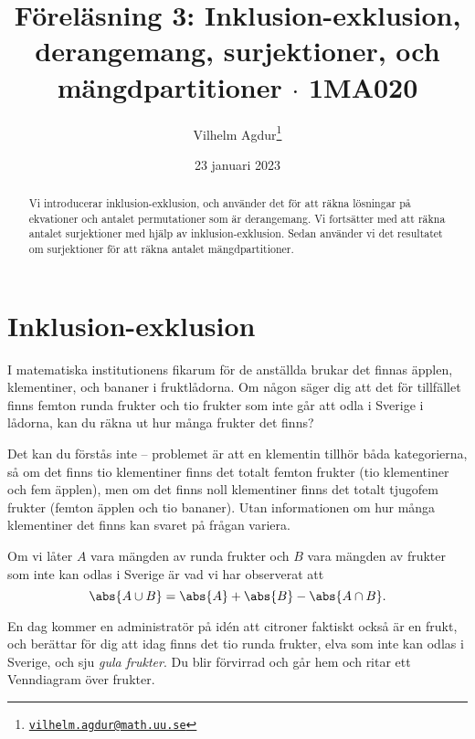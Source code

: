 \documentclass[nobib]{tufte-handout}
\title{Föreläsning 3: Inklusion-exklusion, derangemang, surjektioner, och mängdpartitioner $\cdot$ 1MA020}
\author[Vilhelm Agdur]{Vilhelm Agdur\thanks{\href{mailto:vilhelm.agdur@math.uu.se}{\nolinkurl{vilhelm.agdur@math.uu.se}}}}
\date{23 januari 2023}
\begin{document}
\maketitle%

\begin{abstract}
\noindent
Vi introducerar inklusion-exklusion, och använder det för att räkna lösningar på ekvationer och antalet permutationer som är derangemang. Vi fortsätter med att räkna antalet surjektioner med hjälp av inklusion-exklusion. Sedan använder vi det resultatet om surjektioner för att räkna antalet mängdpartitioner.
\end{abstract}

\section{Inklusion-exklusion}

I matematiska institutionens fikarum för de anställda brukar det finnas äpplen, klementiner, och bananer i fruktlådorna. Om någon säger dig att det för tillfället finns femton runda frukter och tio frukter som inte går att odla i Sverige i lådorna, kan du räkna ut hur många frukter det finns?

Det kan du förstås inte -- problemet är att en klementin tillhör båda kategorierna, så om det finns tio klementiner finns det totalt femton frukter (tio klementiner och fem äpplen), men om det finns noll klementiner finns det totalt tjugofem frukter (femton äpplen och tio bananer). Utan informationen om hur många klementiner det finns kan svaret på frågan variera.

Om vi låter $A$ vara mängden av runda frukter och $B$ vara mängden av frukter som inte kan odlas i Sverige är vad vi har observerat att
$$\abs{A \cup B} = \abs{A} + \abs{B} - \abs{A \cap B}.$$

En dag kommer en administratör på idén att citroner faktiskt också är en frukt, och berättar för dig att idag finns det tio runda frukter, elva som inte kan odlas i Sverige, och sju \emph{gula frukter}. Du blir förvirrad och går hem och ritar ett Venndiagram över frukter.
\end{document}
